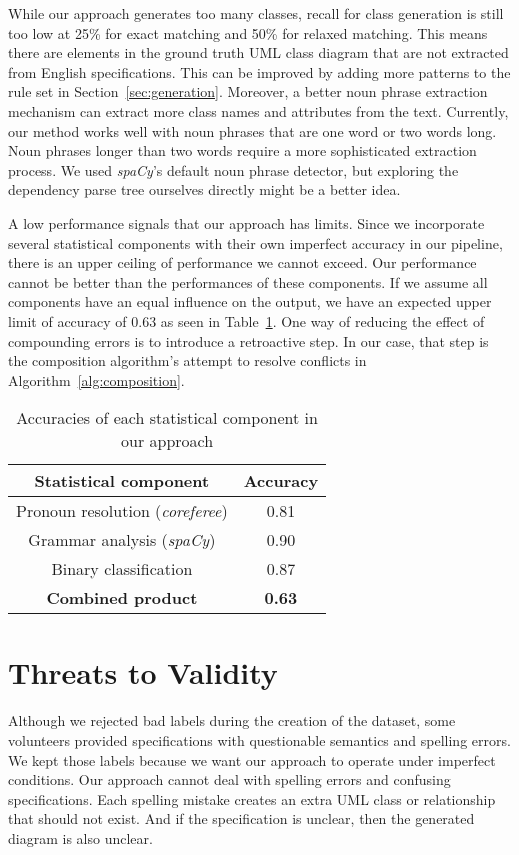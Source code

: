 \documentclass[sigconf]{acmart}
\begin{document}
While our approach generates too many classes, recall for class generation is still too low at 25\% for exact matching and 50\% for relaxed matching. This means there are elements in the ground truth UML class diagram that are not extracted from English specifications. This can be improved by adding more patterns to the rule set in Section~\ref{sec:generation}. Moreover, a better noun phrase extraction mechanism can extract more class names and attributes from the text. Currently, our method works well with noun phrases that are one word or two words long. Noun phrases longer than two words require a more sophisticated extraction process. We used \textit{spaCy}'s default noun phrase detector, but exploring the dependency parse tree ourselves directly might be a better idea.

A low performance signals that our approach has limits. Since we incorporate several statistical components with their own imperfect accuracy in our pipeline, there is an upper ceiling of performance we cannot exceed. Our performance cannot be better than the performances of these components. If we assume all components have an equal influence on the output, we have an expected upper limit of accuracy of 0.63 as seen in Table~\ref{tab:upper-limit}. One way of reducing the effect of compounding errors is to introduce a retroactive step. In our case, that step is the composition algorithm's attempt to resolve conflicts in Algorithm~\ref{alg:composition}.

\begin{table}[h]
    \centering
    \begin{tabular}{|c|c|}
        \hline
        Statistical component & Accuracy \\ \hline
        Pronoun resolution (\textit{coreferee}) & 0.81 \\ \hline
        Grammar analysis (\textit{spaCy}) & 0.90 \\ \hline
        Binary classification & 0.87 \\ \hline \hline
        \textbf{Combined product} & \textbf{0.63} \\ \hline
    \end{tabular}
    \caption{Accuracies of each statistical component in our approach}
    \label{tab:upper-limit}
\end{table}

\section{Threats to Validity} \label{sec:validity}
Although we rejected bad labels during the creation of the dataset, some volunteers provided specifications with questionable semantics and spelling errors. We kept those labels because we want our approach to operate under imperfect conditions. Our approach cannot deal with spelling errors and confusing specifications. Each spelling mistake creates an extra UML class or relationship that should not exist. And if the specification is unclear, then the generated diagram is also unclear.
\end{document}
